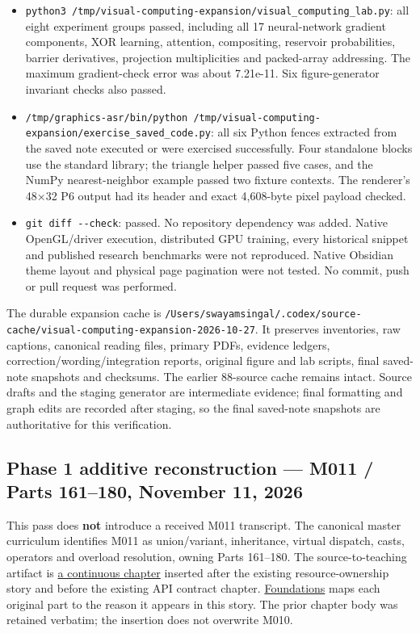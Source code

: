 \begin{itemize}
\item
  \texttt{python3\ /tmp/visual-computing-expansion/visual\_computing\_lab.py}: all eight experiment groups passed, including all 17 neural-network gradient components, XOR learning, attention, compositing, reservoir probabilities, barrier derivatives, projection multiplicities and packed-array addressing. The maximum gradient-check error was about 7.21e-11. Six figure-generator invariant checks also passed.
\item
  \texttt{/tmp/graphics-asr/bin/python\ /tmp/visual-computing-expansion/exercise\_saved\_code.py}: all six Python fences extracted from the saved note executed or were exercised successfully. Four standalone blocks use the standard library; the triangle helper passed five cases, and the NumPy nearest-neighbor example passed two fixture contexts. The renderer's 48×32 P6 output had its header and exact 4,608-byte pixel payload checked.
\item
  \texttt{git\ diff\ -\/-check}: passed. No repository dependency was added. Native OpenGL/driver execution, distributed GPU training, every historical snippet and published research benchmarks were not reproduced. Native Obsidian theme layout and physical page pagination were not tested. No commit, push or pull request was performed.
\end{itemize}

The durable expansion cache is \texttt{/Users/swayamsingal/.codex/source-cache/visual-computing-expansion-2026-10-27}. It preserves inventories, raw captions, canonical reading files, primary PDFs, evidence ledgers, correction/wording/integration reports, original figure and lab scripts, final saved-note snapshots and checksums. The earlier 88-source cache remains intact. Source drafts and the staging generator are intermediate evidence; final formatting and graph edits are recorded after staging, so the final saved-note snapshots are authoritative for this verification.

\subsection{Phase 1 additive reconstruction --- M011 / Parts 161--180, November 11, 2026}\label{appendix-a103e7846d21-phase-1-additive-reconstruction-m011-parts-161180-november-11-2026}

This pass does \textbf{not} introduce a received M011 transcript. The canonical master curriculum identifies M011 as union/variant, inheritance, virtual dispatch, casts, operators and overload resolution, owning Parts 161--180. The source-to-teaching artifact is \hyperref[01-foundations-i-ch004-from-one-owned-resource-to-many-requests-and-a-replaceable-backend]{a continuous chapter} inserted after the existing resource-ownership story and before the existing API contract chapter. \hyperref[appendix-fd090d982a15-m011-parts-161180-a-request-changes-shape-and-a-backend-changes-implementation]{Foundations} maps each original part to the reason it appears in this story. The prior chapter body was retained verbatim; the insertion does not overwrite M010.

